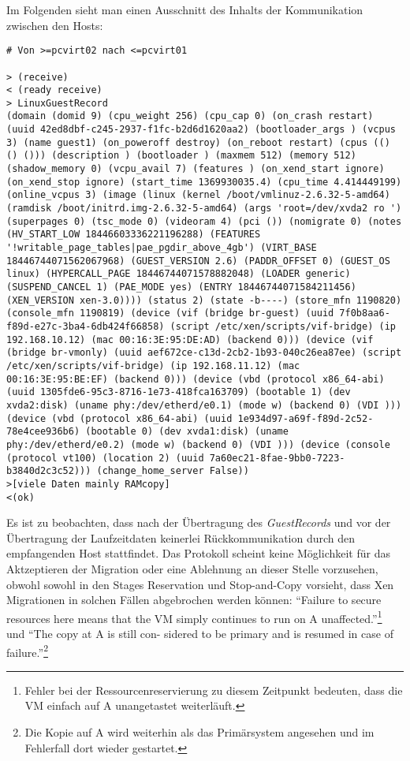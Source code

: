 Im Folgenden sieht man einen Ausschnitt des Inhalts der Kommunikation zwischen den Hosts:
\setupVerbatimOut
\begin{verbatim}
# Von >=pcvirt02 nach <=pcvirt01

> (receive)
< (ready receive)
> LinuxGuestRecord
(domain (domid 9) (cpu_weight 256) (cpu_cap 0) (on_crash restart) (uuid 42ed8dbf-c245-2937-f1fc-b2d6d1620aa2) (bootloader_args ) (vcpus 3) (name guest1) (on_poweroff destroy) (on_reboot restart) (cpus (() () ())) (description ) (bootloader ) (maxmem 512) (memory 512) (shadow_memory 0) (vcpu_avail 7) (features ) (on_xend_start ignore) (on_xend_stop ignore) (start_time 1369930035.4) (cpu_time 4.414449199) (online_vcpus 3) (image (linux (kernel /boot/vmlinuz-2.6.32-5-amd64) (ramdisk /boot/initrd.img-2.6.32-5-amd64) (args 'root=/dev/xvda2 ro ') (superpages 0) (tsc_mode 0) (videoram 4) (pci ()) (nomigrate 0) (notes (HV_START_LOW 18446603336221196288) (FEATURES '!writable_page_tables|pae_pgdir_above_4gb') (VIRT_BASE 18446744071562067968) (GUEST_VERSION 2.6) (PADDR_OFFSET 0) (GUEST_OS linux) (HYPERCALL_PAGE 18446744071578882048) (LOADER generic) (SUSPEND_CANCEL 1) (PAE_MODE yes) (ENTRY 18446744071584211456) (XEN_VERSION xen-3.0)))) (status 2) (state -b----) (store_mfn 1190820) (console_mfn 1190819) (device (vif (bridge br-guest) (uuid 7f0b8aa6-f89d-e27c-3ba4-6db424f66858) (script /etc/xen/scripts/vif-bridge) (ip 192.168.10.12) (mac 00:16:3E:95:DE:AD) (backend 0))) (device (vif (bridge br-vmonly) (uuid aef672ce-c13d-2cb2-1b93-040c26ea87ee) (script /etc/xen/scripts/vif-bridge) (ip 192.168.11.12) (mac 00:16:3E:95:BE:EF) (backend 0))) (device (vbd (protocol x86_64-abi) (uuid 1305fde6-95c3-8716-1e73-418fca163709) (bootable 1) (dev xvda2:disk) (uname phy:/dev/etherd/e0.1) (mode w) (backend 0) (VDI ))) (device (vbd (protocol x86_64-abi) (uuid 1e934d97-a69f-f89d-2c52-78e4cee936b6) (bootable 0) (dev xvda1:disk) (uname phy:/dev/etherd/e0.2) (mode w) (backend 0) (VDI ))) (device (console (protocol vt100) (location 2) (uuid 7a60ec21-8fae-9bb0-7223-b3840d2c3c52))) (change_home_server False))
>[viele Daten mainly RAMcopy]
<(ok)
\end{verbatim}
\label{xen_bullshit}
Es ist zu beobachten, dass nach der Übertragung des \emph{GuestRecords} und vor der Übertragung der Laufzeitdaten keinerlei Rückkommunikation durch den empfangenden Host stattfindet. Das Protokoll scheint keine Möglichkeit für das Aktzeptieren der Migration oder eine Ablehnung an dieser Stelle vorzusehen, obwohl \cite{clark2005live} sowohl in den Stages Reservation und Stop-and-Copy vorsieht, dass Xen Migrationen in solchen Fällen abgebrochen werden können: ``Failure to secure resources here means that the VM simply continues to run on A unaffected.''\footnote{Fehler bei der Ressourcenreservierung zu diesem Zeitpunkt bedeuten, dass die VM einfach auf A unangetastet weiterläuft.}\cite{clark2005live} und ``The copy at A is still con-
sidered to be primary and is resumed in case of failure.''\footnote{Die Kopie auf A wird weiterhin als das Primärsystem angesehen und im Fehlerfall dort wieder gestartet.}\cite{clark2005live}



